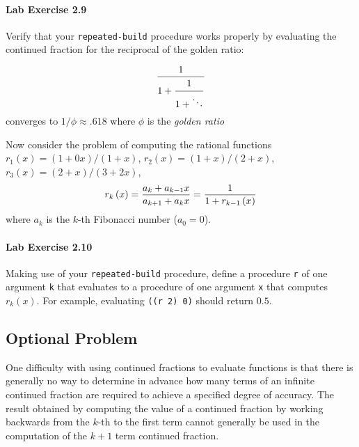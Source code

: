 \paragraph{ Lab Exercise 2.9 }
Verify that your {\tt repeated-build} procedure works properly by evaluating
the continued fraction for the reciprocal of the golden ratio:

\begin{displaymath}
{1 \over {\displaystyle 1 +
        {\strut 1 \over {\displaystyle 1 + \ddots } }}}
\end{displaymath}
converges to $1/\phi\approx .618$ where $\phi$ is the {\em golden ratio}

Now consider the problem of computing the rational functions
$r_1(x)=(1+0x)/(1+x)$, $r_2(x)=(1+x)/(2+x)$, $r_3(x)=(2+x)/(3+2x)$,
\begin{displaymath} 
r_k\left( x \right)={{a_k+a_{k-1}x} \over {a_{k+1}+a_kx}}={1 \over
{1+r_{k-1}\left( x \right)}}
\end{displaymath} 
where $a_k$ is the $k$-th Fibonacci number ($a_0=0$).

\paragraph{ Lab Exercise 2.10 }
Making  use of your {\tt repeated-build} procedure, define a procedure 
{\tt r} of one argument {\tt k} that evaluates to a procedure of 
one argument {\tt x} that computes $r_k(x)$. For example,
evaluating {\tt ((r 2) 0)} should return $0.5$.

\subsection{Optional Problem}

One difficulty with using continued fractions to evaluate functions
is that there is generally no way to determine in advance how many
terms of an infinite continued fraction are required to achieve a
specified degree of accuracy. The result obtained by computing the
value of a continued fraction by working backwards from the $k$-th to
the first term cannot generally be used in the computation of the
$k+1$ term continued fraction.

